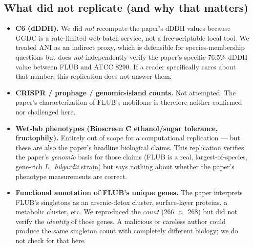 \documentclass[11pt,letterpaper]{article}
\begin{document}
\subsection{What did not replicate (and why that matters)}
\begin{itemize}[leftmargin=1.2em]
  \item \textbf{C6 (dDDH).} We did \emph{not} recompute the paper's dDDH values because GGDC is a rate-limited web batch service, not a free-scriptable local tool. We treated ANI as an indirect proxy, which is defensible for species-membership questions but does \emph{not} independently verify the paper's specific 76.5\% dDDH value between FLUB and ATCC 8290. If a reader specifically cares about that number, this replication does not answer them.
  \item \textbf{CRISPR / prophage / genomic-island counts.} Not attempted. The paper's characterization of FLUB's mobilome is therefore neither confirmed nor challenged here.
  \item \textbf{Wet-lab phenotypes (Bioscreen C ethanol/sugar tolerance, fructophily).} Entirely out of scope for a computational replication --- but these are also the paper's headline biological claims. This replication verifies the paper's \emph{genomic} basis for those claims (FLUB is a real, largest-of-species, gene-rich \emph{L.\ hilgardii} strain) but says nothing about whether the paper's phenotype measurements are correct.
  \item \textbf{Functional annotation of FLUB's unique genes.} The paper interprets FLUB's singletons as an arsenic-detox cluster, surface-layer proteins, a metabolic cluster, etc. We reproduced the \emph{count} (266 $\approx$ 268) but did not verify the \emph{identity} of those genes. A malicious or careless author could produce the same singleton count with completely different biology; we do not check for that here.
\end{itemize}
\end{document}
